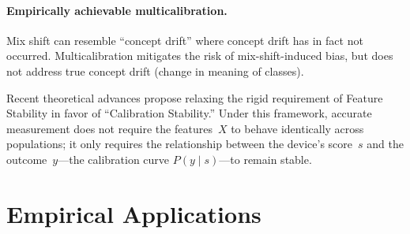 \documentclass[12pt]{article}
\begin{document}


\paragraph{Empirically achievable multicalibration.}

Mix shift can resemble ``concept drift'' where concept drift has in fact
not occurred. Multicalibration mitigates the risk of mix-shift-induced
bias, but does not address true concept drift (change in meaning of
classes).

Recent theoretical advances \citep{wu2024stable} propose relaxing the
rigid requirement of Feature Stability in favor of ``Calibration
Stability.'' Under this framework, accurate measurement does not require
the features~$X$ to behave identically across populations; it only requires
the relationship between the device's score~$s$ and the outcome~$y$---the
calibration curve $P(y \mid s)$---to remain stable.



\section{Empirical Applications}

\end{document}
